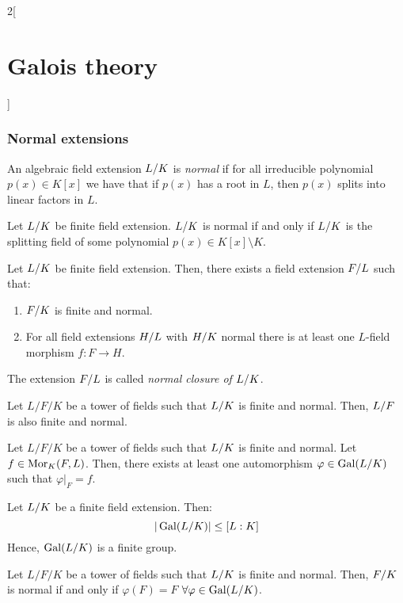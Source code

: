 \documentclass[../../../main.tex]{subfiles}
\begin{document}
\begin{multicols}{2}[\section{Galois theory}]
  \subsubsection{Normal extensions}
  \begin{definition}
    An algebraic field extension $\quot{L}{K}$ is \textit{normal} if for all irreducible polynomial $p(x)\in K[x]$ we have that if $p(x)$ has a root in $L$, then $p(x)$ splits into linear factors in $L$.
  \end{definition}
  \begin{theorem}
    Let $\quot{L}{K}$ be finite field extension. $\quot{L}{K}$ is normal if and only if $\quot{L}{K}$ is the splitting field of some polynomial $p(x)\in K[x]\setminus K$.
  \end{theorem}
  \begin{corollary}
    Let $\quot{L}{K}$ be finite field extension. Then, there exists a field extension $\quot{F}{L}$ such that:
    \begin{enumerate}
      \item $\quot{F}{K}$ is finite and normal.
      \item For all field extensions $\quot{H}{L}$ with $\quot{H}{K}$ normal there is at least one $L$-field morphism $f:F\rightarrow H$.
    \end{enumerate}
    The extension $\quot{F}{L}$ is called \textit{normal closure of $\quot{L}{K}$}.
  \end{corollary}
  \begin{corollary}
    Let $L/F/K$ be a tower of fields such that $\quot{L}{K}$ is finite and normal. Then, $\quot{L}{F}$ is also finite and normal.
  \end{corollary}
  \begin{corollary}
    Let $L/F/K$ be a tower of fields such that $\quot{L}{K}$ is finite and normal. Let $f\in\operatorname{Mor}_K(F,L)$. Then, there exists at least one automorphism $\varphi\in\Gal(\quot{L}{K})$ such that $\varphi|_F=f$.
  \end{corollary}
  \begin{corollary}
    Let $\quot{L}{K}$ be a finite field extension. Then: $$\textstyle|\Gal(\quot{L}{K})|\leq[L:K]$$ Hence, $\Gal(\quot{L}{K})$ is a finite group.
  \end{corollary}
  \begin{corollary}
    Let $L/F/K$ be a tower of fields such that $\quot{L}{K}$ is finite and normal. Then, $\quot{F}{K}$ is normal if and only if $\varphi(F)=F$ $\forall\varphi\in\Gal(\quot{L}{K})$.
  \end{corollary}

\end{multicols}
\end{document}

